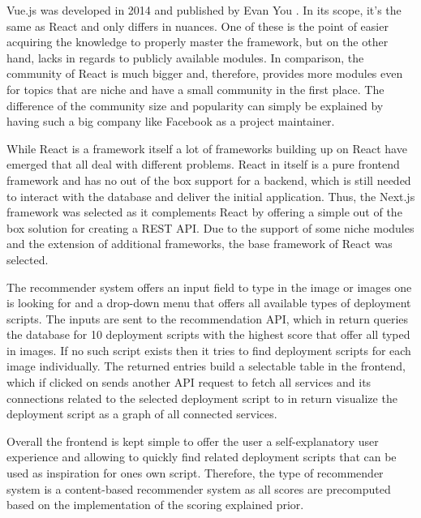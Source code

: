 Vue.js was developed in 2014 and published by Evan You \cite{vuejs}. In its scope, it's the same as React and only differs in nuances. One of these is the point of easier acquiring the knowledge to properly master the framework, but on the other hand, lacks in regards to publicly available modules. In comparison, the community of React is much bigger and, therefore, provides more modules even for topics that are niche and have a small community in the first place. The difference of the community size and popularity can simply be explained by having such a big company like Facebook as a project maintainer.

While React is a framework itself a lot of frameworks building up on React have emerged that all deal with different problems. React in itself is a pure frontend framework and has no out of the box support for a backend, which is still needed to interact with the database and deliver the initial application. Thus, the Next.js framework was selected as it complements React by offering a simple out of the box solution for creating a REST API. Due to the support of some niche modules and the extension of additional frameworks, the base framework of React was selected.

The recommender system offers an input field to type in the image or images one is looking for and a drop-down menu that offers all available types of deployment scripts. The inputs are sent to the recommendation API, which in return queries the database for 10 deployment scripts with the highest score that offer all typed in images. If no such script exists then it tries to find deployment scripts for each image individually. The returned entries build a selectable table in the frontend, which if clicked on sends another API request to fetch all services and its connections related to the selected deployment script to in return visualize the deployment script as a graph of all connected services.

Overall the frontend is kept simple to offer the user a self-explanatory user experience and allowing to quickly find related deployment scripts that can be used as inspiration for ones own script. Therefore, the type of recommender system is a content-based recommender system as all scores are precomputed based on the implementation of the scoring explained prior.
